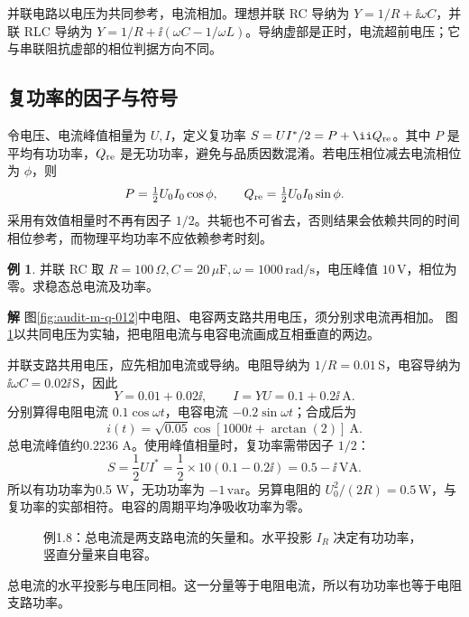 \documentclass[11pt,openany,fontset=fandol]{ctexbook}
\theoremstyle{plain}\newtheorem{theorem}{定理}[chapter]\newtheorem{proposition}[theorem]{命题}
\theoremstyle{definition}\newtheorem{definition}{定义}[chapter]\newtheorem{example}{例}[chapter]
\theoremstyle{remark}\newtheorem*{remark}{说明}
\newcommand{\SolutionStart}{\par\nobreak\medskip\nobreak\noindent\textbf{解}\quad\ignorespaces}
\newenvironment{solution}{\SolutionStart}{\par\medskip}
\begin{document}
并联电路以电压为共同参考，电流相加。理想并联 RC 导纳为 $Y=1/R+\ii\omega C$，并联 RLC 导纳为 $Y=1/R+\ii(\omega C-1/\omega L)$。导纳虚部是正时，电流超前电压；它与串联阻抗虚部的相位判据方向不同。

\subsection{复功率的因子与符号}
令电压、电流峰值相量为 $U,I$，定义复功率 $S=UI^*/2=P+\ii Q_{\rm re}$。其中 $P$ 是平均有功功率，$Q_{\rm re}$ 是无功功率，避免与品质因数混淆。若电压相位减去电流相位为 $\phi$，则
\[
P=\tfrac12U_0I_0\cos\phi,\qquad Q_{\rm re}=\tfrac12U_0I_0\sin\phi.
\]
采用有效值相量时不再有因子 $1/2$。共轭也不可省去，否则结果会依赖共同的时间相位参考，而物理平均功率不应依赖参考时刻。

\begin{example}
并联 RC 取 $R=100\,\Omega,C=20\,\mu\mathrm F,\omega=1000\,\mathrm{rad/s}$，电压峰值 $10\,\mathrm V$，相位为零。求稳态总电流及功率。
\end{example}

\begin{solution}
图\ref{fig:audit-m-q-012}中电阻、电容两支路共用电压，须分别求电流再相加。
图\ref{fig:eg-1-8}以共同电压为实轴，把电阻电流与电容电流画成互相垂直的两边。

并联支路共用电压，应先相加电流或导纳。电阻导纳为 $1/R=0.01\,\mathrm S$，电容导纳为 $\ii\omega C=0.02\ii\,\mathrm S$，因此
\[
Y=0.01+0.02\ii,\qquad I=YU=0.1+0.2\ii\ \mathrm A.
\]
分别算得电阻电流 $0.1\cos\omega t$，电容电流 $-0.2\sin\omega t$；合成后为
\[
i(t)=\sqrt{0.05}\cos[1000t+\arctan(2)]\ \mathrm A.
\]
总电流峰值约0.2236 A。使用峰值相量时，复功率需带因子 $1/2$：
\[
S=\frac12UI^*=\frac12\times10(0.1-0.2\ii)=0.5-\ii\ \mathrm{VA}.
\]
所以有功功率为0.5 W，无功功率为 $-1\,\mathrm{var}$。另算电阻的 $U_0^2/(2R)=0.5\,\mathrm W$，与复功率的实部相符。电容的周期平均净吸收功率为零。

\begin{figure}[H]\centering
{}
\caption{例1.8：总电流是两支路电流的矢量和。水平投影 $I_R$ 决定有功功率，竖直分量来自电容。}\label{fig:eg-1-8}
\end{figure}

总电流的水平投影与电压同相。这一分量等于电阻电流，所以有功功率也等于电阻支路功率。
\end{solution}
\end{document}
